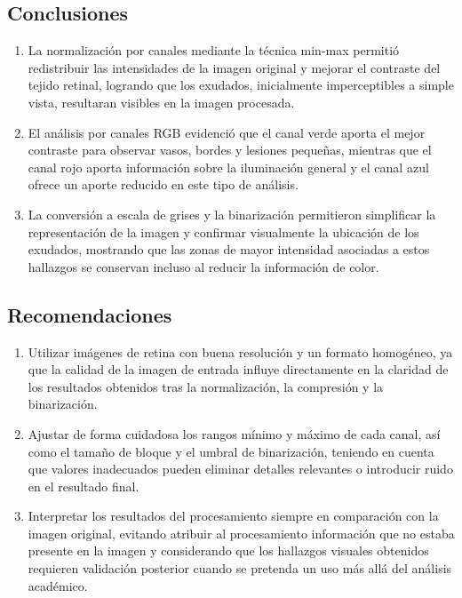 \documentclass[11pt]{article}
\begin{document}
\subsection{Conclusiones}
\begin{enumerate}
    \item La normalización por canales mediante la técnica min-max permitió redistribuir las intensidades de la imagen original y mejorar el contraste del tejido retinal, logrando que los exudados, inicialmente imperceptibles a simple vista, resultaran visibles en la imagen procesada.

    \item El análisis por canales RGB evidenció que el canal verde aporta el mejor contraste para observar vasos, bordes y lesiones pequeñas, mientras que el canal rojo aporta información sobre la iluminación general y el canal azul ofrece un aporte reducido en este tipo de análisis.

    \item La conversión a escala de grises y la binarización permitieron simplificar la representación de la imagen y confirmar visualmente la ubicación de los exudados, mostrando que las zonas de mayor intensidad asociadas a estos hallazgos se conservan incluso al reducir la información de color.
\end{enumerate}

\subsection{Recomendaciones}
\begin{enumerate}
    \item Utilizar imágenes de retina con buena resolución y un formato homogéneo, ya que la calidad de la imagen de entrada influye directamente en la claridad de los resultados obtenidos tras la normalización, la compresión y la binarización.

    \item Ajustar de forma cuidadosa los rangos mínimo y máximo de cada canal, así como el tamaño de bloque y el umbral de binarización, teniendo en cuenta que valores inadecuados pueden eliminar detalles relevantes o introducir ruido en el resultado final.

    \item Interpretar los resultados del procesamiento siempre en comparación con la imagen original, evitando atribuir al procesamiento información que no estaba presente en la imagen y considerando que los hallazgos visuales obtenidos requieren validación posterior cuando se pretenda un uso más allá del análisis académico.
\end{enumerate}
\end{document}
